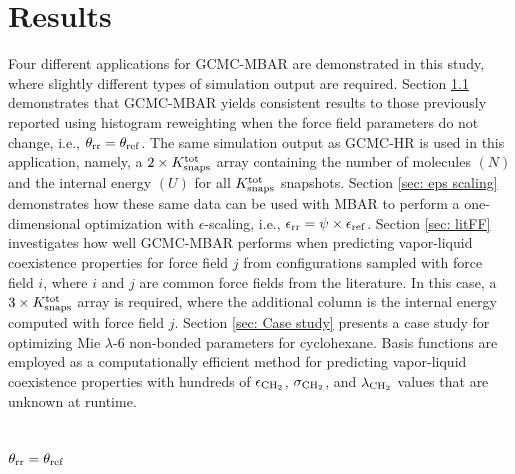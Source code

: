 \documentclass[journal=jced,manuscript=article]{achemso}
\begin{document}

\section{Results} \label{sec: Results}

Four different applications for GCMC-MBAR are demonstrated in this study, where slightly different types of simulation output are required. Section \ref{sec: Constant theta} demonstrates that GCMC-MBAR yields consistent results to those previously reported using histogram reweighting when the force field parameters do not change, i.e., $\theta_{\rm rr} = \theta_{\rm ref}$. The same simulation output as GCMC-HR is used in this application, namely, a $2 \times K^{\rm tot}_{\rm snaps}$ array containing the number of molecules $(N)$ and the internal energy $(U)$ for all $K^{\rm tot}_{\rm snaps}$ snapshots. Section \ref{sec: eps scaling} demonstrates how these same data can be used with MBAR to perform a one-dimensional optimization with $\epsilon$-scaling, i.e., $\epsilon_{\rm rr} = \psi \times \epsilon_{\rm ref}$. Section \ref{sec: litFF} investigates how well GCMC-MBAR performs when predicting vapor-liquid coexistence properties for force field $j$ from configurations sampled with force field $i$, where $i$ and $j$ are common force fields from the literature. In this case, a $3 \times K^{\rm tot}_{\rm snaps}$ array is required, where the additional column is the internal energy computed with force field $j$. Section \ref{sec: Case study} presents a case study for optimizing Mie $\lambda$-6 non-bonded parameters for cyclohexane. Basis functions are employed as a computationally efficient method for predicting vapor-liquid coexistence properties with hundreds of $\epsilon_{\rm CH_2}$, $\sigma_{\rm CH_2}$, and $\lambda_{\rm CH_2}$ values that are unknown at runtime.   


\subsection{$\theta_{\rm rr} = \theta_{\rm ref}$} \label{sec: Constant theta}
\end{document}
